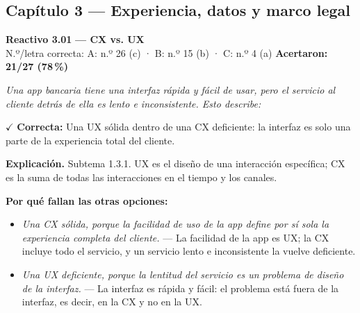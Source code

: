 \documentclass[10pt,letterpaper]{article}
\begin{document}
\subsection*{\color{guinda}Capítulo 3 — Experiencia, datos y marco legal}
\begin{minipage}{\textwidth}
{\color{guinda}\textbf{Reactivo 3.01}} \textbf{— CX vs. UX}\\[-1pt]
{\scriptsize N.º/letra correcta: A: n.º 26 (c) · B: n.º 15 (b) · C: n.º 4 (a) \hfill \textbf{Acertaron: 21/27 (78\,\%)}}

\textit{Una app bancaria tiene una interfaz rápida y fácil de usar, pero el servicio al cliente detrás de ella es lento e inconsistente. Esto describe:}

\textcolor{verde}{$\checkmark$} \textbf{Correcta:} Una UX sólida dentro de una CX deficiente: la interfaz es solo una parte de la experiencia total del cliente.

\textbf{Explicación.} Subtema 1.3.1. UX es el diseño de una interacción específica; CX es la suma de todas las interacciones en el tiempo y los canales.

\textbf{Por qué fallan las otras opciones:}
\begin{itemize}[itemsep=0pt,topsep=1pt,leftmargin=1.3em,parsep=0pt]
\item[\textcolor{rojo}{$\times$}] \textit{Una CX sólida, porque la facilidad de uso de la app define por sí sola la experiencia completa del cliente.} --- La facilidad de la app es UX; la CX incluye todo el servicio, y un servicio lento e inconsistente la vuelve deficiente.
\item[\textcolor{rojo}{$\times$}] \textit{Una UX deficiente, porque la lentitud del servicio es un problema de diseño de la interfaz.} --- La interfaz es rápida y fácil: el problema está fuera de la interfaz, es decir, en la CX y no en la UX.
\end{itemize}
\end{minipage}\par\vspace{5pt}{\color{gray!40}\hrule}\vspace{5pt}
\end{document}
